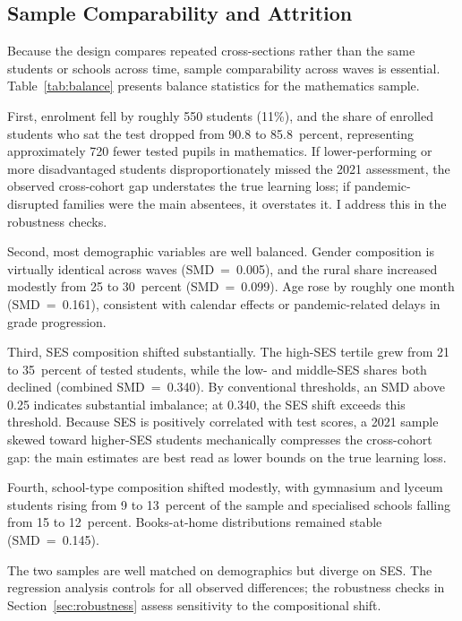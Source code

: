 \subsection{Sample Comparability and Attrition}
\label{subsec:attrition}

Because the design compares repeated cross-sections rather than the same students
or schools across time, sample comparability across waves is essential.
Table~\ref{tab:balance} presents balance statistics for the mathematics sample.

First, enrolment fell by roughly 550 students (11\%), and the share of enrolled
students who sat the test dropped from 90.8 to 85.8~percent, representing
approximately 720 fewer tested pupils in mathematics. If lower-performing or
more disadvantaged students disproportionately missed the 2021 assessment, the
observed cross-cohort gap understates the true learning loss; if pandemic-disrupted
families were the main absentees, it overstates it. I address this in the
robustness checks.

Second, most demographic variables are well balanced. Gender composition is virtually
identical across waves (SMD~=~0.005), and the rural share increased modestly from
25 to 30~percent (SMD~=~0.099). Age rose by roughly one month (SMD~=~0.161),
consistent with calendar effects or pandemic-related delays in grade progression.

Third, SES composition shifted substantially. The high-SES tertile grew from
21 to 35~percent of tested students, while the low- and middle-SES shares both
declined (combined SMD~=~0.340). By conventional thresholds, an SMD above 0.25
indicates substantial imbalance; at 0.340, the SES shift exceeds this threshold.
Because SES is positively correlated with test scores, a 2021 sample skewed toward
higher-SES students mechanically compresses the cross-cohort gap: the main estimates
are best read as lower bounds on the true learning loss.

Fourth, school-type composition shifted modestly, with gymnasium and lyceum students
rising from 9 to 13~percent of the sample and specialised schools falling from
15 to 12~percent. Books-at-home distributions remained stable (SMD~=~0.145).

The two samples are well matched on demographics but diverge on SES.
The regression analysis controls for all observed differences; the robustness
checks in Section~\ref{sec:robustness} assess sensitivity to the compositional
shift.

